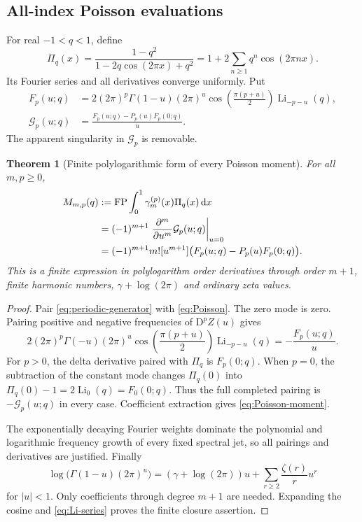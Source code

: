 \documentclass[11pt]{article}
\newtheorem{theorem}{Theorem}[section]
\theoremstyle{definition}\newtheorem{definition}[theorem]{Definition}
\theoremstyle{remark}\newtheorem{remark}[theorem]{Remark}
\DeclareMathOperator{\Li}{Li}
\DeclareMathOperator{\FP}{FP}
\newcommand{\dd}{\,\mathrm d}
\newcommand{\D}{\mathrm D}
\begin{document}
\subsection{All-index Poisson evaluations}
For real $-1<q<1$, define
\begin{equation}\label{eq:Poisson}
\Pi_q(x)=\frac{1-q^2}{1-2q\cos(2\pi x)+q^2}
=1+2\sum_{n\ge1}q^n\cos(2\pi nx).
\end{equation}
Its Fourier series and all derivatives converge uniformly. Put
\begin{align}\label{eq:Fp}
F_p(u;q)&=2(2\pi)^p\Gamma(1-u)(2\pi)^u
\cos\left(\frac{\pi(p+u)}2\right)\Li_{-p-u}(q),\\
\mathcal G_p(u;q)&=\frac{F_p(u;q)-P_p(u)F_p(0;q)}u.\label{eq:Gp}
\end{align}
The apparent singularity in $\mathcal G_p$ is removable.

\begin{theorem}[Finite polylogarithmic form of every Poisson moment]\label{thm:poisson}
For all $m,p\ge0$,
\begin{align}\label{eq:Poisson-moment}
M_{m,p}(q)&:=\FP\int_0^1\gamma_m^{(p)}(x)\Pi_q(x)\dd x\\
&=(-1)^{m+1}\left.\frac{\partial^m}{\partial u^m}\mathcal G_p(u;q)\right|_{u=0}\notag\\
&=(-1)^{m+1}m![u^{m+1}]
\bigl(F_p(u;q)-P_p(u)F_p(0;q)\bigr).\notag
\end{align}
This is a finite expression in polylogarithm order derivatives through order $m+1$, finite harmonic numbers, $\gamma+\log(2\pi)$ and ordinary zeta values.
\end{theorem}
\begin{proof}
Pair \eqref{eq:periodic-generator} with \eqref{eq:Poisson}. The zero mode is zero. Pairing positive and negative frequencies of $\D^pZ(u)$ gives
\[
2(2\pi)^p\Gamma(-u)(2\pi)^u
\cos\left(\frac{\pi(p+u)}2\right)\Li_{-p-u}(q)
=-\frac{F_p(u;q)}u.
\]
For $p>0$, the delta derivative paired with $\Pi_q$ is $F_p(0;q)$. When $p=0$, the subtraction of the constant mode changes $\Pi_q(0)$ into $\Pi_q(0)-1=2\Li_0(q)=F_0(0;q)$. Thus the full completed pairing is $-\mathcal G_p(u;q)$ in every case. Coefficient extraction gives \eqref{eq:Poisson-moment}.

The exponentially decaying Fourier weights dominate the polynomial and logarithmic frequency growth of every fixed spectral jet, so all pairings and derivatives are justified. Finally
\begin{equation}\label{eq:Gamma-Taylor}
\log\bigl(\Gamma(1-u)(2\pi)^u\bigr)
=(\gamma+\log(2\pi))u+\sum_{r\ge2}\frac{\zeta(r)}r u^r
\end{equation}
for $|u|<1$. Only coefficients through degree $m+1$ are needed. Expanding the cosine and \eqref{eq:Li-series} proves the finite closure assertion.
\end{proof}
\end{document}
